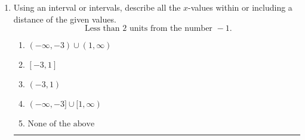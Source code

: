 \documentclass[14pt]{extbook}
\newcommand{\litem}[1]{\item#1\hspace*{-1cm}\rule{\textwidth}{0.4pt}}
\begin{document}
\begin{enumerate}
{\begin{enumerate}[label=\Alph*.]
\end{enumerate} }
\litem{
Using an interval or intervals, describe all the $x$-values within or including a distance of the given values.\[ \text{ Less than } 2 \text{ units from the number } -1. \]\begin{enumerate}[label=\Alph*.]
\item \( (-\infty, -3) \cup (1, \infty) \)
\item \( [-3, 1] \)
\item \( (-3, 1) \)
\item \( (-\infty, -3] \cup [1, \infty) \)
\item \( \text{None of the above} \)

\end{enumerate} }
\end{enumerate}
\end{document}
